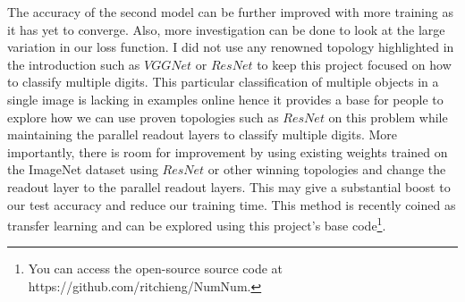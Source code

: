 \documentclass[twoside, column]{article}
\begin{document}
The accuracy of the second model can be further improved with more training as it has yet to converge. Also, more investigation can be done to look at the large variation in our loss function. I did not use any renowned topology highlighted in the introduction such as $VGGNet$ or $ResNet$ to keep this project focused on how to classify multiple digits. This particular classification of multiple objects in a single image is lacking in examples online hence it provides a base for people to explore how we can use proven topologies such as $ResNet$ on this problem while maintaining the parallel readout layers to classify multiple digits. More importantly, there is room for improvement by using existing weights trained on the ImageNet dataset using $ResNet$ or other winning topologies and change the readout layer to the parallel readout layers. This may give a substantial boost to our test accuracy and reduce our training time. This method is recently coined as transfer learning and can be explored using this project's base code\footnote{You can access the open-source source code at https://github.com/ritchieng/NumNum.}.

\end{document}
